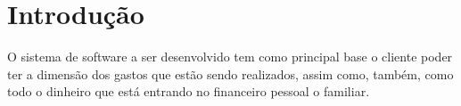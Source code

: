 \section{Introdução}

O sistema de software a ser desenvolvido tem como principal base o cliente poder ter a dimensão dos gastos que estão sendo realizados, assim como, também, como todo o dinheiro que está entrando no financeiro pessoal o familiar.
